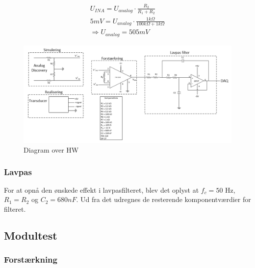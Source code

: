 \begin{equation}
\begin{split}
U_{INA} = U_{analog} \cdot \frac{R_2}{R_1 + R_2} \\
5mV = U_{analog}\cdot \frac{1k\Omega}{100k\Omega+1k\Omega}\\ \Rightarrow U_{analog}= 505mV
\end{split}
\end{equation} 

\begin{figure}[H]
	\centering
	\includegraphics[width=1.0\textwidth]{Figurer/diagram_over_HW}
	\caption{Diagram over HW}
	\label{fig:HW}
\end{figure}

\subsubsection{Lavpas}
For at opnå den ønskede effekt i lavpasfilteret, blev det oplyst at $ f_c=50$ Hz, $ R_1 = R_2 $ og $ C_2=680 nF$. Ud fra det udregnes de resterende komponentværdier for filteret.  


\subsection{Modultest}
\subsubsection{Forstærkning}
